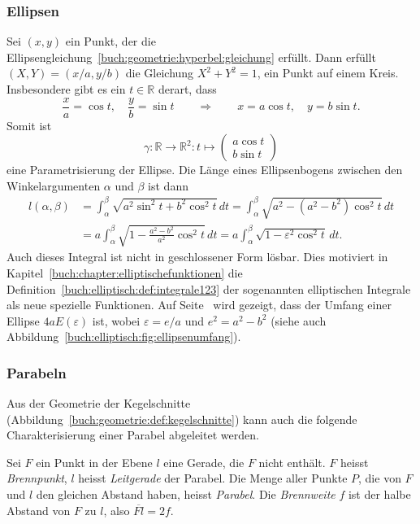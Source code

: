 %
%
\subsubsection{Ellipsen}
Sei $(x,y)$ ein Punkt, der die
Ellipsengleichung~\eqref{buch:geometrie:hyperbel:gleichung} erfüllt.
Dann erfüllt $(X,Y)=(x/a, y/b)$ die Gleichung $X^2+Y^2=1$, ein Punkt auf
einem Kreis.
Insbesondere gibt es ein $t\in\mathbb{R}$ derart, dass
\[
\frac{x}{a} = \cos t ,\quad \frac{y}{b}=\sin t
\qquad\Rightarrow\qquad
x=a\cos t,\quad y=b\sin t.
\]
Somit ist
\[
\gamma
\colon
\mathbb{R}\to\mathbb{R}^2
:
t \mapsto\begin{pmatrix}a\cos t\\b\sin t\end{pmatrix}
\]
eine Parametrisierung der Ellipse.
Die Länge eines Ellipsenbogens zwischen den Winkelargumenten $\alpha$ und
$\beta$ ist dann
\begin{align*}
l(\alpha,\beta)
&=
\int_\alpha^\beta
\sqrt{
a^2 \sin^2 t + b^2 \cos^2t
}
\,dt
=
\int_\alpha^\beta
\sqrt{
a^2 - (a^2-b^2)\cos^2 t
}
\,dt
\\
&=
a
\int_\alpha^\beta
\sqrt{
1 - \frac{a^2-b^2}{a^2} \cos^2t
}
\,dt
=
a\int_\alpha^\beta
\sqrt{
1-\varepsilon^2 \cos^2t
}
\,dt.
\end{align*}
Auch dieses Integral ist nicht in geschlossener Form lösbar.
Dies motiviert in Kapitel~\ref{buch:chapter:elliptischefunktionen}
die Definition~\ref{buch:elliptisch:def:integrale123}
der sogenannten elliptischen Integrale als neue
spezielle Funktionen.
Auf Seite~\pageref{buch:elliptisch:fig:ellipsenumfang} wird gezeigt,
dass der Umfang einer Ellipse $4aE(\varepsilon)$ ist,
wobei $\varepsilon=e/a$ und $e^2=a^2-b^2$ (siehe auch
Abbildung~\ref{buch:elliptisch:fig:ellipsenumfang}).

%
%
\subsubsection{Parabeln}
Aus der Geometrie der Kegelschnitte
(Abbildung~\ref{buch:geometrie:def:kegelschnitte})
kann auch die folgende Charakterisierung einer Parabel abgeleitet werden.

\begin{definition}
\label{buch:geometrie:def:parabel}
Sei $F$ ein Punkt in der Ebene $l$ eine Gerade, die $F$ nicht enthält.
$F$ heisst {\em Brennpunkt}, $l$ heisst {\em Leitgerade} der Parabel.
Die Menge aller Punkte $P$, die von $F$ und $l$ den gleichen
Abstand haben, heisst {\em Parabel}.
Die {\em Brennweite} $f$ ist der halbe Abstand von $F$ zu $l$,
also $\overline{Fl}=2f$.
\end{definition}


